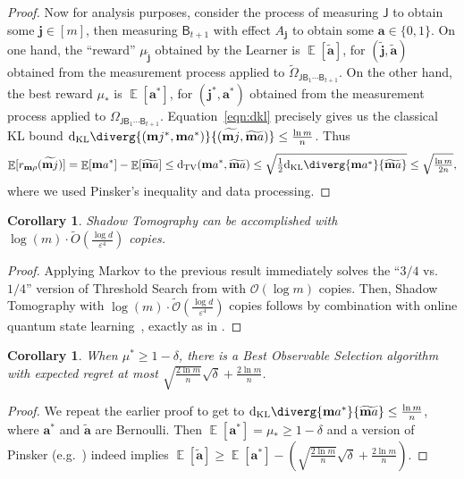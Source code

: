 \documentclass[10pt]{article}
\newcommand{\dtv}[2]{\mathrm{d}_{\mathrm{TV}}(#1,#2)}
\newcommand{\dKL}[2]{\mathrm{d}_{\mathrm{KL}}\diverg{#1}{#2}}
\newcommand{\eps}{\epsilon}
\newcommand{\wt}[1]{\widetilde{#1}}
\renewcommand{\epsilon}{\varepsilon}
\let\mathbm\bm
\newcommand{\ba}{\mathbm{a}}
\newcommand{\bj}{\mathbm{j}}
\newcommand{\brho}{\mathbm{\rho}}
\DeclareMathOperator*{\EE}{\mathbb{E}}
\renewcommand{\bm}{\mathbf{m}}
\newtheorem{corollary}[theorem]{Corollary}
\newtheorem{remark}[theorem]{Remark}
\begin{document}
\begin{proof}
    Now for analysis purposes, consider the process of measuring $\mathsf{J}$ to obtain some $\bj \in [m]$, then measuring $\mathsf{B}_{t+1}$ with effect $A_{\bj}$ to obtain some $\ba \in \{0,1\}$.
    On one hand, the ``reward'' $\mu_{\wt{\bj}}$ obtained by the Learner is $\EE[\wt{\ba}]$, for $(\wt{\bj}, \wt{\ba})$ obtained from the measurement process applied to $\wt{\Omega}_{\mathsf{J}\mathsf{B}_1\cdots\mathsf{B}_{t+1}}$.  On the other hand, the best reward $\mu_*$ is $\EE[\ba^*]$, for $(\bj^*, \ba^*)$ obtained from the measurement process applied to $\Omega_{\mathsf{J}\mathsf{B}_1\cdots\mathsf{B}_{t+1}}$.
    Equation~\eqref{eqn:dkl} precisely gives us the classical KL bound $\dKL{(\bj^*,\ba^*)}{(\wt{\bj},\wt{\ba})} \leq \frac{\ln m}{n}$.  Thus 
    \begin{equation}
        \EE[r_{\brho}(\wt{\bj})] = \EE[\ba^*] - \EE[\wt{\ba}] \leq \dtv{\ba^*}{\wt{\ba}} \leq \sqrt{\tfrac12\dKL{\ba^*}{\wt{\ba}}} %
        \leq \sqrt{\tfrac{\ln m}{2n}},
    \end{equation}
    where we used Pinsker's inequality and data processing.
\end{proof}
\begin{corollary}
    Shadow Tomography can be accomplished with $\log(m) \cdot \wt{O}(\frac{\log d}{\eps^4})$ copies.
\end{corollary}
\begin{proof}
    Applying Markov to the previous result immediately solves the ``$3/4$ vs.~$1/4$'' version of Threshold Search from \cite[Section~4.1]{BO24} with $\mathcal{O}(\log m)$ copies.  Then, Shadow Tomography with $\log(m) \cdot \wt{\mathcal{O}}(\frac{\log d}{\eps^4})$ copies follows by combination with online quantum state learning~\cite{ACH+19}, exactly as in \cite{Aar20,BO24}.
\end{proof}
\begin{corollary}
    When $\mu^* \geq 1-\delta$, there is a Best Observable Selection algorithm with expected regret at most $\sqrt{\frac{2 \ln m}{n}} \sqrt{\delta} + \frac{2\ln m}{n}$.
\end{corollary}
\begin{proof}
    We repeat the earlier proof to get to $\dKL{\ba^*}{\wt{\ba}} \leq \frac{\ln m}{n}$, where $\ba^*$ and $\wt{\ba}$ are Bernoulli.  Then $\EE[\ba^*] = \mu_* \geq 1-\delta$ and a  version of Pinsker (e.g.~\cite[Lemma~6]{GMS19}) indeed implies $\EE[\wt{\ba}] \geq \EE[\ba^*] - (\sqrt{\frac{2\ln m}{n}}\sqrt{\delta} + \frac{2\ln m}{n})$.
\end{proof}
\end{document}
